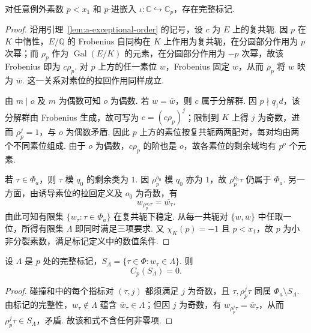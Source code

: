 \begin{lemma}[例外素数处的完整标记]
\label{lem:a-full-mark}
\emitthmsource
对任意例外素数 $p<x_1$ 和 $p$-进嵌入 $\iota\colon\mathbb C\hookrightarrow\mathbb C_p$，存在完整标记.
\end{lemma}
\begin{proof}
沿用引理~\ref{lem:a-exceptional-order} 的记号，设 $c$ 为 $E$ 上的复共轭. 因 $p$ 在 $K$ 中惰性，$E/\mathbb Q$ 的 Frobenius 自同构在 $K$ 上作用为复共轭，在分圆部分作用为 $p$ 次幂；而 $\rho_p$ 作为 $\operatorname{Gal}(E/K)$ 的元素，在分圆部分作用为 $-p$ 次幂，故该 Frobenius 即为 $c\rho_p$. 对 $p$ 上方的任一素位 $w$，Frobenius 固定 $w$，从而 $\rho_p$ 将 $w$ 映为 $\bar w$. 这一关系对素位的拉回作用同样成立.

由 $m\mid o$ 及 $m$ 为偶数可知 $o$ 为偶数. 若 $w=\bar w$，则 $c$ 属于分解群. 因 $p\nmid q_1d$，该分解群由 Frobenius 生成，故可写为 $c=(c\rho_p)^j$；限制到 $K$ 上得 $j$ 为奇数，进而 $\rho_p^j=1$，与 $o$ 为偶数矛盾. 因此 $p$ 上方的素位按复共轭两两配对，每对均由两个不同素位组成. 由于 $o$ 为偶数，$c\rho_p$ 的阶也是 $o$，故各素位的剩余域均有 $p^o$ 个元素.

若 $\tau\in\Phi_a$，则 $\tau$ 模 $q_0$ 的剩余类为 $1$. 因 $\rho_p^{o_0}$ 模 $q_0$ 亦为 $1$，故 $\rho_p^{o_0}\tau$ 仍属于 $\Phi_a$. 另一方面，由诱导素位的拉回定义及 $o_0$ 为奇数，有
\[
 w_{\rho_p^{o_0}\tau}=\overline{w_\tau}.
\]
由此可知有限集 $\{w_\tau:\tau\in\Phi_a\}$ 在复共轭下稳定. 从每一共轭对 $\{w,\bar w\}$ 中任取一位，所得有限集 $\Lambda$ 即同时满足三项要求. 又 $\chi_K(p)=-1$ 且 $p<x_1$，故 $p$ 为小非分裂素数，满足标记定义中的数值条件.
\end{proof}

\begin{lemma}[完整标记排除碰撞]
\label{lem:a-full-mark-collision}
\emitthmsource
设 $\Lambda$ 是 $p$ 处的完整标记，$S_\Lambda=\{\tau\in\Phi:w_\tau\in\Lambda\}$. 则
\[
 C_p(S_\Lambda)=0.
\]
\end{lemma}
\begin{proof}
碰撞和中的每个指标对 $(\tau,j)$ 都须满足 $j$ 为奇数，且 $\tau,\rho_p^j\tau$ 同属 $\Phi_a\setminus S_\Lambda$. 由标记的完整性，$w_\tau\notin\Lambda$ 蕴含 $\bar w_\tau\in\Lambda$；但因 $j$ 为奇数，有 $w_{\rho_p^j\tau}=\bar w_\tau$，从而 $\rho_p^j\tau\in S_\Lambda$，矛盾. 故该和式不含任何非零项.
\end{proof}

